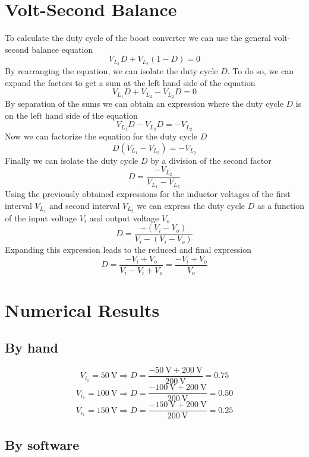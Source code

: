 %	

\section{Volt-Second Balance}
To calculate the duty cycle of the boost converter we can use the general
volt-second balance equation
\[ V_{L_{1}} D + V_{L_{2}} (1-D) = 0 \]
By rearranging the equation, we can isolate the duty cycle $D$. To do so,
we can expand the factors to get a sum at the left hand side of the equation
\[ V_{L_{1}} D + V_{L_{2}} - V_{L_{2}} D = 0 \]
By separation of the sums we can obtain an expression where the duty cycle $D$
is on the left hand side of the equation
\[ V_{L_{1}} D - V_{L_{2}} D = - V_{L_{2}} \]
Now we can factorize the equation for the duty cycle $D$
\[ D (V_{L_{1}} - V_{L_{2}}) = -V_{L_{2}} \]
Finally we can isolate the duty cycle $D$ by a division of the second factor
\[ D = \frac{- V_{L_{2}}}{V_{L_{1}} - V_{L_{2}}} \]
Using the previously obtained expressions for the inductor voltages of the
first interval $V_{L_{1}}$ and second interval $V_{L_{2}}$ we can express
the duty cycle $D$ as a function of the input voltage $V_i$ and output voltage
$V_o$
\[  D = \frac{-(V_i - V_o)}{V_i - (V_i - V_o)} \]
Expanding this expression leads to the reduced and final expression
\[ D = \frac{- V_i + V_o}{V_i - V_i + V_o} = \frac{- V_i + V_o}{V_o} \]

\section{Numerical Results}

\subsection{By hand}
\[ V_{i_{1}} = \SI{50}{\volt}  \Rightarrow D = \frac{- \SI{50}{\volt}  + \SI{200}{\volt}}{\SI{200}{\volt}}  = 0.75 \]
\[ V_{i_{1}} = \SI{100}{\volt} \Rightarrow D = \frac{- \SI{100}{\volt} + \SI{200}{\volt}}{\SI{200}{\volt}} = 0.50 \]
\[ V_{i_{1}} = \SI{150}{\volt} \Rightarrow D = \frac{- \SI{150}{\volt} + \SI{200}{\volt}}{\SI{200}{\volt}} = 0.25 \]

\subsection{By software}



%
\clearpage
